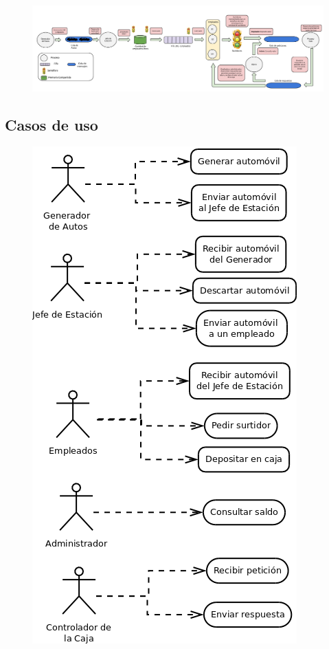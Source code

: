 \documentclass[12pt,a4paper,spanish]{article}
\begin{document}
	\begin{figure}[h]
	\includegraphics[angle=90, scale = 0.27]{esquema_2.png}
	\centering
	\end{figure}

	\newpage
	\subsection{Casos de uso}

	\begin{figure}[h]
	\includegraphics[scale=0.50]{casos_de_uso.png}
	\centering
	\end{figure}
\end{document}
